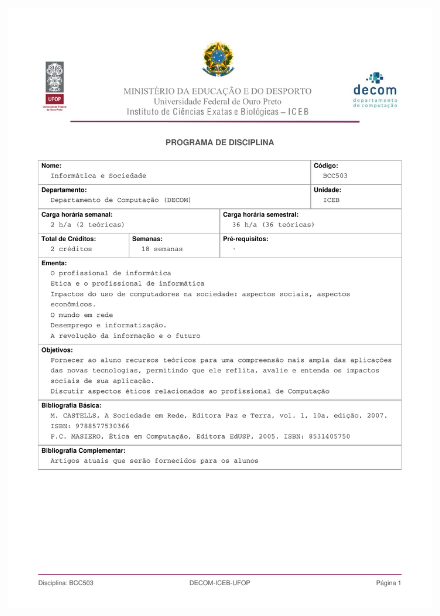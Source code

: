 \begin{figure}[p]
	\centering 
	\includegraphics[scale=0.7]{capitulos/anexo1-programas-disciplina/eg32.pdf}
\end{figure}

